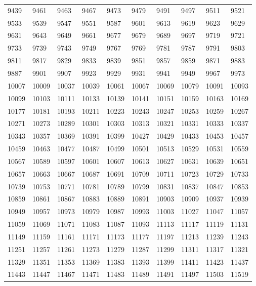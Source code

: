 \begin{longtable}{llllllllll}
9439	&	9461	&	9463	&	9467	&	9473	&	9479	&	9491	&	9497	&	9511	&	9521	\\
9533	&	9539	&	9547	&	9551	&	9587	&	9601	&	9613	&	9619	&	9623	&	9629	\\
9631	&	9643	&	9649	&	9661	&	9677	&	9679	&	9689	&	9697	&	9719	&	9721	\\
9733	&	9739	&	9743	&	9749	&	9767	&	9769	&	9781	&	9787	&	9791	&	9803	\\
9811	&	9817	&	9829	&	9833	&	9839	&	9851	&	9857	&	9859	&	9871	&	9883	\\
9887	&	9901	&	9907	&	9923	&	9929	&	9931	&	9941	&	9949	&	9967	&	9973	\\
10007	&	10009	&	10037	&	10039	&	10061	&	10067	&	10069	&	10079	&	10091	&	10093	\\
10099	&	10103	&	10111	&	10133	&	10139	&	10141	&	10151	&	10159	&	10163	&	10169	\\
10177	&	10181	&	10193	&	10211	&	10223	&	10243	&	10247	&	10253	&	10259	&	10267	\\
10271	&	10273	&	10289	&	10301	&	10303	&	10313	&	10321	&	10331	&	10333	&	10337	\\
10343	&	10357	&	10369	&	10391	&	10399	&	10427	&	10429	&	10433	&	10453	&	10457	\\
10459	&	10463	&	10477	&	10487	&	10499	&	10501	&	10513	&	10529	&	10531	&	10559	\\
10567	&	10589	&	10597	&	10601	&	10607	&	10613	&	10627	&	10631	&	10639	&	10651	\\
10657	&	10663	&	10667	&	10687	&	10691	&	10709	&	10711	&	10723	&	10729	&	10733	\\
10739	&	10753	&	10771	&	10781	&	10789	&	10799	&	10831	&	10837	&	10847	&	10853	\\
10859	&	10861	&	10867	&	10883	&	10889	&	10891	&	10903	&	10909	&	10937	&	10939	\\
10949	&	10957	&	10973	&	10979	&	10987	&	10993	&	11003	&	11027	&	11047	&	11057	\\
11059	&	11069	&	11071	&	11083	&	11087	&	11093	&	11113	&	11117	&	11119	&	11131	\\
11149	&	11159	&	11161	&	11171	&	11173	&	11177	&	11197	&	11213	&	11239	&	11243	\\
11251	&	11257	&	11261	&	11273	&	11279	&	11287	&	11299	&	11311	&	11317	&	11321	\\
11329	&	11351	&	11353	&	11369	&	11383	&	11393	&	11399	&	11411	&	11423	&	11437	\\
11443	&	11447	&	11467	&	11471	&	11483	&	11489	&	11491	&	11497	&	11503	&	11519	\\

\end{longtable}
